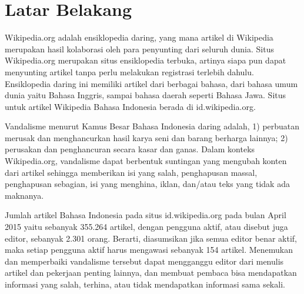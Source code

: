 \section{Latar Belakang}\label{sec:latar-belakang}

Wikipedia.org adalah ensiklopedia daring, yang mana artikel di Wikipedia merupakan hasil kolaborasi oleh para penyunting dari seluruh dunia. Situs Wikipedia.org merupakan situs ensiklopedia terbuka, artinya siapa pun dapat menyunting artikel tanpa perlu melakukan registrasi terlebih dahulu. Ensiklopedia daring ini memiliki artikel dari berbagai bahasa, dari bahasa umum dunia yaitu Bahasa Inggris, sampai bahasa daerah seperti Bahasa Jawa. Situs untuk artikel Wikipedia Bahasa Indonesia berada di id.wikipedia.org.

Vandalisme menurut Kamus Besar Bahasa Indonesia daring adalah, 1) perbuatan merusak dan menghancurkan hasil karya seni dan barang berharga lainnya; 2) perusakan dan penghancuran secara kasar dan ganas. Dalam konteks Wikipedia.org, vandalisme dapat berbentuk suntingan yang mengubah konten dari artikel sehingga memberikan isi yang salah, penghapusan massal, penghapusan sebagian, isi yang menghina, iklan, dan/atau teks yang tidak ada maknanya.

Jumlah artikel Bahasa Indonesia pada situs id.wikipedia.org pada bulan April 2015 yaitu sebanyak 355.264 artikel, dengan pengguna aktif, atau disebut juga editor, sebanyak 2.301 orang. Berarti, diasumsikan jika semua editor benar aktif, maka setiap pengguna aktif harus mengawasi sebanyak 154 artikel. Menemukan dan memperbaiki vandalisme tersebut dapat mengganggu editor dari menulis artikel dan pekerjaan penting lainnya, dan membuat pembaca bisa mendapatkan informasi yang salah, terhina, atau tidak mendapatkan informasi sama sekali.